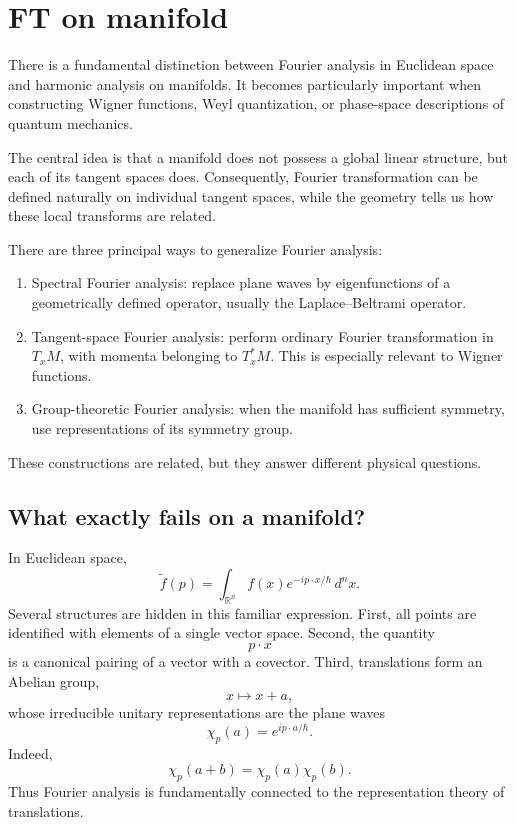 \section{FT on manifold}
\label{sec:math-ftm}

There is a fundamental distinction between Fourier analysis in Euclidean space
and harmonic analysis on manifolds. It becomes particularly important when
constructing Wigner functions, Weyl quantization, or phase-space descriptions
of quantum mechanics.

The central idea is that a manifold does not possess a global linear structure,
but each of its tangent spaces does. Consequently, Fourier transformation can
be defined naturally on individual tangent spaces, while the geometry tells us
how these local transforms are related.

There are three principal ways to generalize Fourier analysis:
\begin{enumerate}
   \item Spectral Fourier analysis: replace plane waves by eigenfunctions of a
       geometrically defined operator, usually the Laplace–Beltrami operator.
   \item Tangent-space Fourier analysis: perform ordinary Fourier
       transformation in \(T_xM\), with momenta belonging to \(T_x^*M\). This
        is especially relevant to Wigner functions.
   \item  Group-theoretic Fourier analysis: when the manifold has sufficient
       symmetry, use representations of its symmetry group.

\end{enumerate}
These constructions are related, but they answer different physical questions.

\subsection{What exactly fails on a manifold?}
In Euclidean space,
\[
\widetilde f(p)=\int_{\mathbb R^n}
f(x)e^{-ip\cdot x/\hbar}\,d^nx.
\]
Several structures are hidden in this familiar expression.
First, all points are identified with elements of a single vector space. 
Second, the quantity
\[
p\cdot x
\]
is a canonical pairing of a vector with a covector. 
Third, translations form an Abelian group,
\[
x\mapsto x+a,
\]
whose irreducible unitary representations are the plane waves
\[
\chi_p(a)=e^{ip\cdot a/\hbar}.
\]
Indeed,
\[
\chi_p(a+b)=\chi_p(a)\chi_p(b).
\]
Thus Fourier analysis is fundamentally connected to the representation theory of translations.

